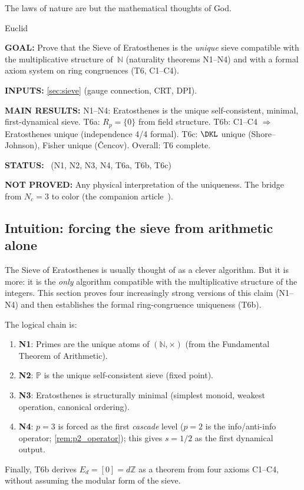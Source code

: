 \documentclass[12pt,a4paper]{article}
\begin{document}
\epigraph{The laws of nature are but the mathematical thoughts of God.}{Euclid}

\begin{statusbox}
\textbf{GOAL:}
  Prove that the Sieve of Eratosthenes is the \emph{unique} sieve
  compatible with the multiplicative structure of~$\mathbb{N}$
  (naturality theorems N1--N4) and with a formal axiom system
  on ring congruences (T6, C1--C4).

\textbf{INPUTS:}
  \cref{sec:sieve} (gauge connection, CRT, DPI).

\textbf{MAIN RESULTS:}
  N1--N4: Eratosthenes is the unique self-consistent, minimal,
  first-dynamical sieve.
  T6a: $R_p = \{0\}$ from field structure.
  T6b: C1--C4 $\Rightarrow$ Eratosthenes unique
  (independence 4/4 formal).
  T6c: $\DKL$ unique (Shore--Johnson), Fisher unique
  (\v Cencov).
  Overall: T6 complete.

\textbf{STATUS:}
  \THMTAG~(N1, N2, N3, N4, T6a, T6b, T6c)

\textbf{NOT PROVED:}
  Any physical interpretation of the uniqueness.
  The bridge from $N_c = 3$ to color (the companion article~\cite{companion_M5}).
\end{statusbox}

\subsection{Intuition: forcing the sieve from arithmetic alone}
\label{sec:ch2_intuition}

The Sieve of Eratosthenes is usually thought of as a clever algorithm.
But it is more: it is the \emph{only} algorithm compatible with the
multiplicative structure of the integers. This section proves four
increasingly strong versions of this claim (N1--N4) and then establishes
the formal ring-congruence uniqueness (T6b).

The logical chain is:
\begin{enumerate}
\item \textbf{N1}: Primes are the unique atoms of $(\mathbb{N}, \times)$
  (from the Fundamental Theorem of Arithmetic).
\item \textbf{N2}: $\mathbb{P}$ is the unique self-consistent sieve (fixed point).
\item \textbf{N3}: Eratosthenes is structurally minimal (simplest monoid,
  weakest operation, canonical ordering).
\item \textbf{N4}: $p = 3$ is forced as the first \emph{cascade} level
  ($p = 2$ is the info/anti-info operator; \cref{rem:p2_operator});
  this gives $s = 1/2$ as the first dynamical output.
\end{enumerate}
Finally, T6b derives $E_d = [0] = d\mathbb{Z}$ as a theorem
from four axioms C1--C4, without assuming the modular form of the sieve.
\end{document}
